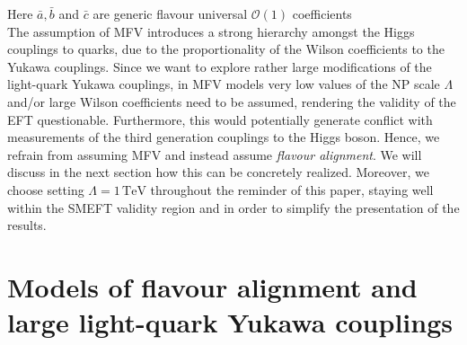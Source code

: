 Here $\bar{a}, \bar{b}$ and $\bar{c}$ are generic flavour universal $\mathcal{O}(1)$ coefficients\\ The assumption of MFV introduces a strong hierarchy amongst the Higgs couplings to quarks, due to the proportionality of the Wilson coefficients to the Yukawa couplings. Since we want to explore rather large modifications of the light-quark Yukawa couplings, in MFV models very low values of the NP scale $\Lambda$ and/or large Wilson coefficients need to be assumed, rendering the validity of the EFT questionable. Furthermore, this would potentially generate conflict with measurements of the third generation couplings to the Higgs boson. Hence, we refrain from assuming MFV and instead assume \textit{flavour alignment}. We will discuss in the next section how this can be concretely realized. Moreover, we choose setting $\Lambda= 1\,\mathrm{TeV}$ throughout the reminder of this paper, staying well within the SMEFT validity region and in order to simplify the presentation of the results.


\section{Models of flavour alignment and large light-quark Yukawa couplings}
\label{sec:Model}

